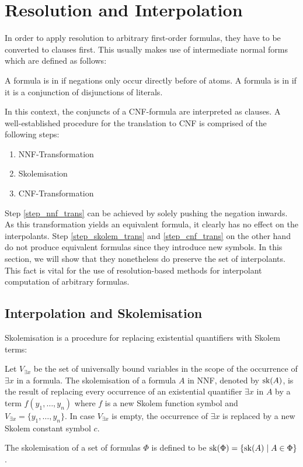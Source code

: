 \section{Resolution and Interpolation}


In order to apply resolution to arbitrary first-order formulas, they have to be converted to clauses first.
This usually makes use of intermediate normal forms which are defined as follows:

\begin{defi}
	A formula is in  if negations only occur directly before of atoms.
	A formula is in  if it is a conjunction of disjunctions of literals.
\end{defi}

In this context, the conjuncts of a CNF-formula are interpreted as clauses.
A well-established procedure for the translation to CNF is comprised of the following steps:

\begin{enumerate}
		\item NNF-Transformation \label{step_nnf_trans}
		\item Skolemisation \label{step_skolem_trans}
		\item CNF-Transformation \label{step_cnf_trans}
\end{enumerate}

Step \ref{step_nnf_trans} can be achieved by solely pushing the negation inwards.
As this transformation yields an equivalent formula, it clearly has no effect on the interpolants.
Step \ref{step_skolem_trans} and \ref{step_cnf_trans} on the other hand do not produce equivalent formulas since they introduce new symbols.
In this section, we will show that they nonetheless do preserve the set of interpolants.
This fact is vital for the use of resolution-based methods for interpolant computation of arbitrary formulas.


\subsection{Interpolation and Skolemisation}

Skolemisation is a procedure for replacing existential quantifiers with Skolem terms:

\begin{defi}
	Let $V_{\exists x}$ be the set of universally bound variables in the scope of the occurrence of $\exists x$ in a formula.
	The skolemisation of a formula $A$ in NNF, denoted by $\operatorname{sk}(A)$, is the result of replacing every occurrence of an existential quantifier $\exists x$ in $A$ by a term $f(y_1, \ldots, y_n)$ where $f$ is a new Skolem function symbol and $V_{\exists x} = \{y_1, \ldots, y_n\}$.
	In case $V_{\exists x}$ is empty, the occurrence of $\exists x$ is replaced by a new Skolem constant symbol $c$.

	The skolemisation of a set of formulas $\Phi$ is defined to be $\operatorname{sk}(\Phi) = \{ \operatorname{sk}(A) \mid A \in \Phi \}$.
\end{defi}


